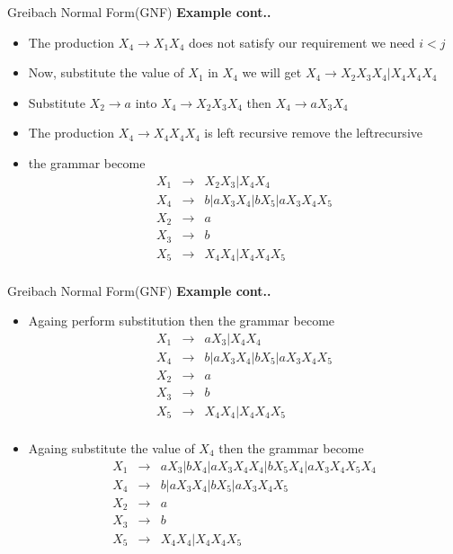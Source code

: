 \documentclass{beamer}
\begin{document}
\begin{frame}{Greibach Normal Form(GNF)}
	\textbf{Example cont..}
	\begin{itemize}
		\item The production $	X_4\rightarrow X_1X_4$ does not satisfy our requirement we need $i < j $
		\item Now, substitute the value of $X_1$ in $X_4$ we will get $X_4 \rightarrow X_2X_3X_4 \big| X_4X_4X_4$ 
		\item Substitute $X_2 \rightarrow a$ into   $X_4 \rightarrow X_2X_3X_4$ then $X_4 \rightarrow aX_3X_4$
		\item The production $X_4 \rightarrow  X_4X_4X_4$ is left recursive remove the leftrecursive 
		\item the grammar become
		\begin{eqnarray*}
			X_1&\rightarrow& X_2X_3|X_4X_4 \\
			X_4&\rightarrow& b|aX_3X_4|bX_5|aX_3X_4X_5 \\
			X_2&\rightarrow&  a\\
			X_3&\rightarrow& b\\
			X_5&\rightarrow& X_4X_4|X_4X_4X_5\\
		\end{eqnarray*}
	\end{itemize}
\end{frame}
\begin{frame}{Greibach Normal Form(GNF)}
	\textbf{Example cont..}
	\begin{itemize}
		\item Againg perform substitution then the grammar become
		\begin{eqnarray*}
			X_1&\rightarrow& aX_3|X_4X_4 \\
			X_4&\rightarrow& b|aX_3X_4|bX_5|aX_3X_4X_5 \\
			X_2&\rightarrow&  a\\
			X_3&\rightarrow& b\\
			X_5&\rightarrow& X_4X_4|X_4X_4X_5\\
		\end{eqnarray*}
	\end{itemize}
\begin{itemize}
	\item Againg substitute the value of $X_4$ then the grammar become
	\begin{eqnarray*}
		X_1&\rightarrow& aX_3|bX_4|aX_3X_4X_4|bX_5X_4|aX_3X_4X_5X_4 \\
		X_4&\rightarrow& b|aX_3X_4|bX_5|aX_3X_4X_5 \\
		X_2&\rightarrow&  a\\
		X_3&\rightarrow& b\\
		X_5&\rightarrow& X_4X_4|X_4X_4X_5\\
	\end{eqnarray*}
\end{itemize}
\end{frame}
\end{document}
